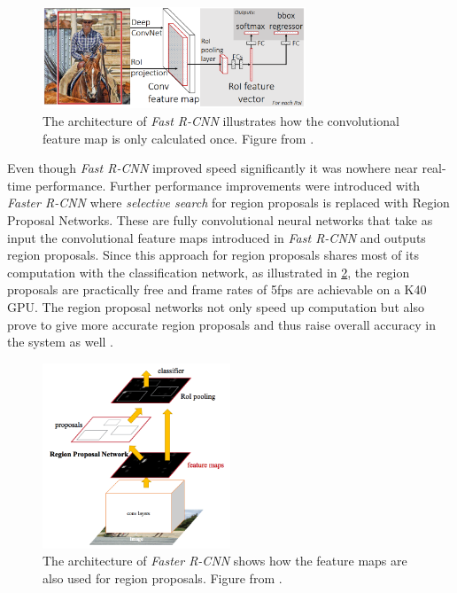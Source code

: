 \documentclass{kththesis}
\newcommand{\bibentry}[1]{\parencite{#1}}
\begin{document}
\begin{figure}[h]
  \centering
  \includegraphics[width=0.7\textwidth]{FastR-CNN}
  \caption{The architecture of \textit{Fast R-CNN} illustrates how the
    convolutional feature map is only calculated once. Figure from \textcite{girshick2015fast}.}
  \label{fig:FastR-CNN}
  \end{figure}

Even though \emph{Fast R-CNN} improved speed significantly it was nowhere near real-time
performance. Further performance improvements were introduced with \emph{Faster
  R-CNN} \bibentry{ren2015faster} where \emph{selective search} for region
proposals is replaced with Region Proposal Networks. These are fully convolutional neural
networks that take as input the convolutional feature maps introduced in 
\emph{Fast R-CNN}\parencite{girshick2015fast} and outputs region proposals. Since this approach for region
proposals shares most of its computation with the classification network, as illustrated in \cref{fig:FasterR-CNN}, the
region proposals are practically free and frame rates of 5fps are achievable on
a K40 GPU.
The region proposal networks not only speed up computation but also prove to
give more accurate region proposals and thus raise overall accuracy in the
system as well \bibentry{ren2015faster}.

\begin{figure}[h]
  \centering
  \includegraphics[width=0.5\textwidth]{FasterR-CNN}
  \caption{The architecture of \textit{Faster R-CNN} shows how the feature maps
    are also used for region proposals. Figure from \textcite[]{ren2015faster}.}
  \label{fig:FasterR-CNN}
  \end{figure}
\end{document}
